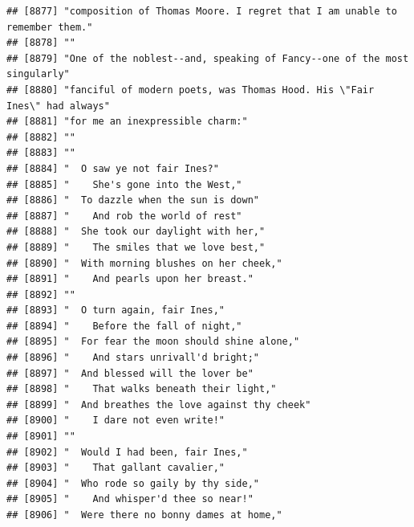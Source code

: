 \documentclass{article}\usepackage[]{graphicx}\usepackage[]{color}
\makeatletter
\newenvironment{kframe}{%
 \def\at@end@of@kframe{}%
 \ifinner\ifhmode%
  \def\at@end@of@kframe{\end{minipage}}%
  \begin{minipage}{\columnwidth}%
 \fi\fi%
 \def\FrameCommand##1{\hskip\@totalleftmargin \hskip-\fboxsep
 \colorbox{shadecolor}{##1}\hskip-\fboxsep
     \hskip-\linewidth \hskip-\@totalleftmargin \hskip\columnwidth}%
 \MakeFramed {\advance\hsize-\width
   \@totalleftmargin\z@ \linewidth\hsize
   \@setminipage}}%
 {\par\unskip\endMakeFramed%
 \at@end@of@kframe}
\newenvironment{knitrout}{}{} %
\makeatother
\begin{document}
\begin{knitrout}
\begin{kframe}
\begin{verbatim}
## [8877] "composition of Thomas Moore. I regret that I am unable to remember them."    
## [8878] ""                                                                            
## [8879] "One of the noblest--and, speaking of Fancy--one of the most singularly"      
## [8880] "fanciful of modern poets, was Thomas Hood. His \"Fair Ines\" had always"     
## [8881] "for me an inexpressible charm:"                                              
## [8882] ""                                                                            
## [8883] ""                                                                            
## [8884] "  O saw ye not fair Ines?"                                                   
## [8885] "    She's gone into the West,"                                               
## [8886] "  To dazzle when the sun is down"                                            
## [8887] "    And rob the world of rest"                                               
## [8888] "  She took our daylight with her,"                                           
## [8889] "    The smiles that we love best,"                                           
## [8890] "  With morning blushes on her cheek,"                                        
## [8891] "    And pearls upon her breast."                                             
## [8892] ""                                                                            
## [8893] "  O turn again, fair Ines,"                                                  
## [8894] "    Before the fall of night,"                                               
## [8895] "  For fear the moon should shine alone,"                                     
## [8896] "    And stars unrivall'd bright;"                                            
## [8897] "  And blessed will the lover be"                                             
## [8898] "    That walks beneath their light,"                                         
## [8899] "  And breathes the love against thy cheek"                                   
## [8900] "    I dare not even write!"                                                  
## [8901] ""                                                                            
## [8902] "  Would I had been, fair Ines,"                                              
## [8903] "    That gallant cavalier,"                                                  
## [8904] "  Who rode so gaily by thy side,"                                            
## [8905] "    And whisper'd thee so near!"                                             
## [8906] "  Were there no bonny dames at home,"                                        

\end{verbatim}
\end{kframe}
\end{knitrout}
\end{document}
